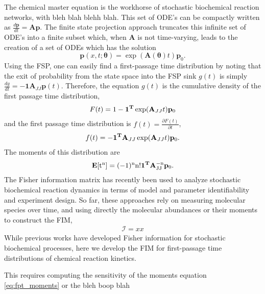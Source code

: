 \documentclass[aps,prl,preprint,groupedaddress]{revtex4-1}
\newcommand{\thv}{\boldsymbol{\theta}}
\newcommand{\Av}{\mathbf{A}}
\newcommand{\Tv}{\mathbf{T}}
\newcommand{\pv}{\mathbf{p}}
\newcommand{\Exp}{\rm{\mathbf{E}}}
\begin{document}
The chemical master equation \cite{xxx} is the workhorse of stochastic biochemical reaction networks, with bleh blah blehh blah.
This set of ODE's can be compactly written as $\frac{d \pv}{dt} = \Av \pv$. The finite state projection approach truncates this infinite set of ODE's into a finite subset which, when $\Av$ is not time-varying, leads to the creation of a set of ODEs which has the solution
\begin{equation}
  \pv(x,t;\thv) = \exp(\Av(\thv) t)\pv_0.
\end{equation}
Using the FSP, one can easily find a first-passage time distribution by noting that the exit of probability from the state space into the FSP sink $g(t)$ is simply $\frac{dg}{dt} = -\mathbf{1} {\Av_{JJ}} \pv(t)$.
Therefore, the equation $g(t)$ is the cumulative density of the first passage time distribution,
\begin{align}
    F(t) = 1 - \mathbf{1}^{\rm{\Tv}} \exp (\Av_{JJ}t) \pv_0
\end{align}
and the first passage time distribution is $ f(t) = \frac{\partial F(t)}{\partial{t}}$,
\begin{align}
    f(t) = -\mathbf{1}^{\rm{\Tv}} \Av_{JJ} \exp(\Av_{JJ}t) \pv_0.
\end{align}
The moments of this distribution are
\begin{align}
    \Exp [t^n] = (-1)^n n! \mathbf{1}^{\rm \Tv} \Av_{JJ}^{-n} \pv_0.
\end{align}
The Fisher information matrix has recently been used to analyze stochastic biochemical reaction dynamics \cite{xxx} in terms of model and parameter identifiability and experiment design. So far, these approaches rely on measuring molecular species over time, and using directly the molecular abundances or their moments to construct the FIM,
\begin{align}
  \mathcal{I} = xx
\end{align}
While previous works have developed Fisher information for stochastic biochemical processes, here we develop the FIM for first-passage time distributions of chemical reaction kinetics.

This requires computing the sensitivity of the moments equation \ref{eq:fpt_moments} or the bleh boop blah
\end{document}
